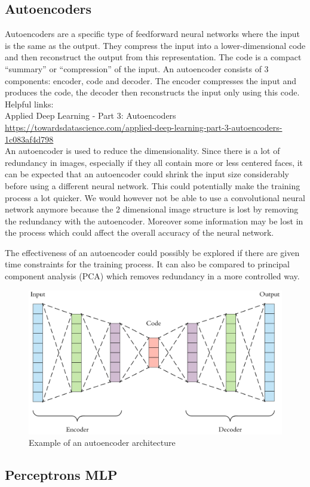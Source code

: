 \subsection{Autoencoders}

Autoencoders are a specific type of feedforward neural networks where the input is the same as the output. They compress the input into a lower-dimensional code and then reconstruct the output from this representation. The code is a compact “summary” or “compression” of the input.
An autoencoder consists of 3 components: encoder, code and decoder. The encoder compresses the input and produces the code, the decoder then reconstructs the input only using this code.\\

Helpful links:\\
Applied Deep Learning - Part 3: Autoencoders
\\
\url{https://towardsdatascience.com/applied-deep-learning-part-3-autoencoders-1c083af4d798}\\

An autoencoder is used to reduce the dimensionality. Since there is a lot of redundancy in images, especially if they all contain more or less centered faces, it can be expected that an autoencoder could shrink the input size considerably before using a different neural network. This could potentially make the training process a lot quicker. We would however not be able to use a convolutional neural network anymore because the 2 dimensional image structure is lost by removing the redundancy with the autoencoder. Moreover some information may be lost in the process which could affect the overall accuracy of the neural network. 

The effectiveness of an autoencoder could possibly be explored if there are given time constraints for the training process. It can also be compared to principal component analysis (PCA) which removes redundancy in a more controlled way. 

\begin{figure}[hbtp]
	\centering
	\includegraphics[width=1\textwidth]{Images/Autoencoder}
	\caption{Example of an autoencoder architecture}
\end{figure}


\subsection{Perceptrons MLP}




\newpage